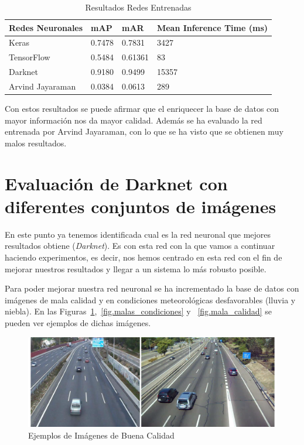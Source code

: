 \begin{table}[H]
\begin{center}
\begin{tabular}{|l|l|l|l|}
\hline
Redes Neuronales & mAP & mAR & Mean Inference Time (ms) \\ 
\hline \hline
Keras & 0.7478 & 0.7831 & 3427\\ \hline
TensorFlow  & 0.5484 & 0.61361 & 83 \\ \hline
Darknet  & 0.9180 & 0.9499 & 15357\\ \hline
Arvind Jayaraman & 0.0384 & 0.0613 & 289\\ \hline
\end{tabular}
\caption{Resultados Redes Entrenadas}
\label{tabla_redes_entrenadas_mayor_database}
\end{center}
\end{table}

Con estos resultados se puede afirmar que el enriquecer la base de datos con mayor información nos da mayor calidad. Además se ha evaluado la red entrenada por Arvind Jayaraman, con lo que se ha visto que se obtienen muy malos resultados.

\section{Evaluación de Darknet con diferentes conjuntos  de imágenes}

En este punto ya tenemos identificada cual es la red neuronal que mejores resultados obtiene (\textit{Darknet}). Es con esta red con la que vamos a continuar haciendo experimentos, es decir, nos hemos centrado en esta red con el fin de mejorar nuestros resultados y llegar a un sistema lo más robusto posible.

Para poder mejorar nuestra red neuronal se ha incrementado la base de datos con imágenes de mala calidad y en condiciones meteorológicas desfavorables (lluvia y niebla). En las Figuras~\ref{fig.buena_calidad},~\ref{fig.malas_condiciones} y ~\ref{fig.mala_calidad} se pueden ver ejemplos de dichas imágenes.

\begin{figure}[H] 
\begin{center}
	\includegraphics[width=1\textwidth]{figures/Experimentos/buena_calidad.png}
   \caption{Ejemplos de Imágenes de Buena Calidad}
	\label{fig.buena_calidad}
\end{center}
\end{figure}

